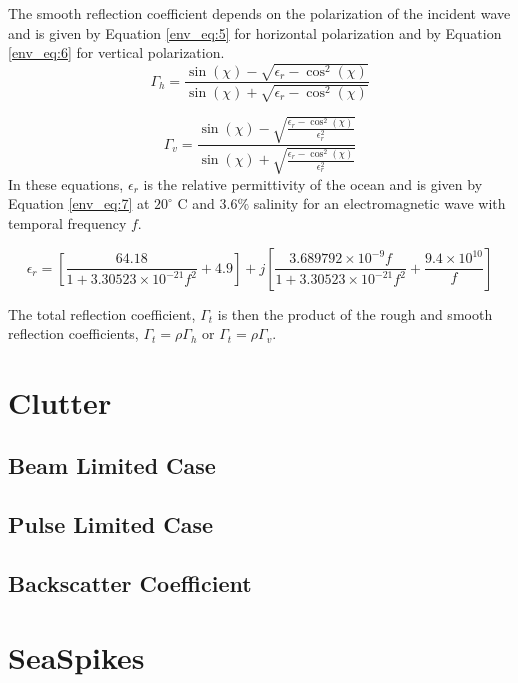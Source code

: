 The smooth reflection coefficient depends on the polarization of the incident wave and is given by Equation \ref{env_eq:5} for horizontal polarization and by Equation \ref{env_eq:6} for vertical polarization.
  \begin{equation}
  \label{env_eq:5}
 \Gamma_h = \frac{\sin(\chi)- \sqrt{\epsilon_r - \cos^2(\chi)}}{\sin(\chi) + \sqrt{\epsilon_r - \cos^2(\chi)}}
  \end{equation}
  
  \begin{equation}
  \label{env_eq:6}
 \Gamma_v = \frac{\sin(\chi)- \sqrt{\frac{\epsilon_r - \cos^2(\chi)}{\epsilon_r^2}}}{\sin(\chi) + \sqrt{\frac{\epsilon_r - \cos^2(\chi)}{\epsilon_r^2}}}
  \end{equation}
In these equations, $\epsilon_r$ is the relative permittivity of the ocean and is given by Equation \ref{env_eq:7} at $20^{\circ}$ C and $3.6\%$ salinity for an electromagnetic wave with temporal frequency $f$. 
  
\begin{equation}
  \label{env_eq:7}
\epsilon_r = \left[\frac{64.18}{1 + 3.30523\times 10^{-21}f^2} + 4.9 \right] + j\left[\frac{3.689792\times 10^{-9}f}{1 + 3.30523\times 10^{-21}f^2} + \frac{9.4\times 10^{10}}{f} \right]
  \end{equation}
  
The total reflection coefficient, $\Gamma_t$ is then the product of the rough and smooth reflection coefficients, $\Gamma_t = \rho\Gamma_h$ or $\Gamma_t = \rho\Gamma_v$.

\section{Clutter}
\subsection{Beam Limited Case}
\subsection{Pulse Limited Case}
\subsection{Backscatter Coefficient}

\section{SeaSpikes}

